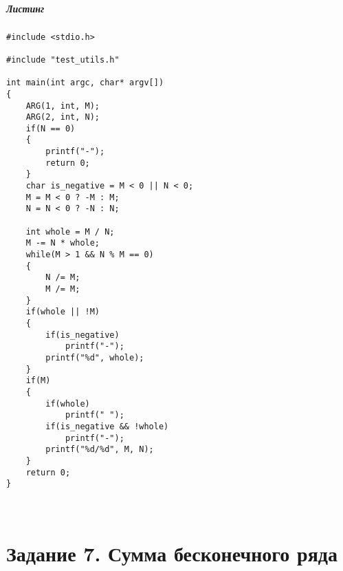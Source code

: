\paragraph{Листинг}
\begin{lstlisting}
#include <stdio.h>

#include "test_utils.h"

int main(int argc, char* argv[])
{
	ARG(1, int, M);
	ARG(2, int, N);
	if(N == 0)
	{
		printf("-");
		return 0;
	}
	char is_negative = M < 0 || N < 0;
	M = M < 0 ? -M : M;
	N = N < 0 ? -N : N;

	int whole = M / N;
	M -= N * whole;
	while(M > 1 && N % M == 0)
	{
		N /= M;
		M /= M;
	}
	if(whole || !M)
	{
		if(is_negative)
			printf("-");
		printf("%d", whole);
	}
	if(M)
	{
		if(whole)
			printf(" ");
		if(is_negative && !whole)
			printf("-");
		printf("%d/%d", M, N);
	}
	return 0;
}

\end{lstlisting}
\\
\chapter*{Задание 7. Сумма бесконечного ряда}

